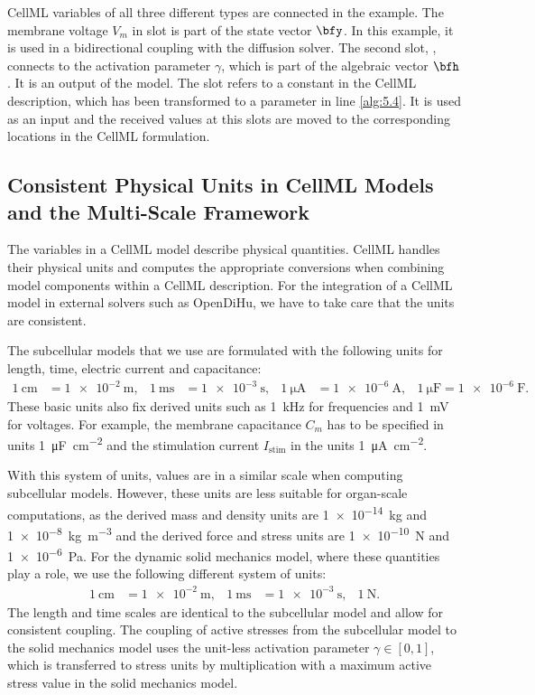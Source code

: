CellML variables of all three different types are connected in the example. The membrane voltage $V_m$ in slot  is part of the state vector $\bfy$. In this example, it is used in a bidirectional coupling with the diffusion solver. The second slot, , connects to the activation parameter $\gamma$, which is part of the algebraic vector $\bfh$. It is an output of the model. The slot  refers to a constant in the CellML description, which has been transformed to a parameter in line \ref{alg:5.4}. It is used as an  input and the received values at this slots are moved to the corresponding locations in the CellML formulation.


\subsection{Consistent Physical Units in CellML Models and the Multi-Scale Framework}

The variables in a CellML model describe physical quantities. CellML handles their physical units and computes the appropriate conversions when combining model components within a CellML description.
For the integration of a CellML model in external solvers such as OpenDiHu, we have to take care that the units are consistent.

The subcellular models that we use are formulated with the following units for length, time, electric current and capacitance:%
\begin{align*}
   \SI{1}{\centi\meter} &= \SI{1e-2}{\meter}, &
   \SI{1}{\milli\second} &= \SI{1e-3}{\second}, &
   \SI{1}{\micro\ampere} &= \SI{1e-6}{\ampere}, &
   \SI{1}{\micro\farad} = \SI{1e-6}{\farad}.
\end{align*}
These basic units also fix derived units such as \SI{1}{\kilo\hertz} for frequencies and \SI{1}{\milli\volt} for voltages. For example, the membrane capacitance $C_m$ has to be specified in units \SI{1}{\micro\farad\per\square\centi\meter} and the stimulation current $I_\text{stim}$ in the units \SI{1}{\micro\ampere\per\square\centi\meter}.

With this system of units, values are in a similar scale when computing subcellular models. However, these units are less suitable for organ-scale computations, as the derived mass and density units are \SI{1e-14}{\kilogram} and \SI{1e-8}{\kilogram\per\meter\cubed} and the derived force and stress units are \SI{1e-10}{\newton} and \SI{1e-6}{\pascal}. For the dynamic solid mechanics model, where these quantities play a role, we use the following different system of units:
\begin{align*}
   \SI{1}{\centi\meter} &= \SI{1e-2}{\meter}, &
   \SI{1}{\milli\second} &= \SI{1e-3}{\second}, &
   \SI{1}{\newton}.
\end{align*}
The length and time scales are identical to the subcellular model and allow for consistent coupling. The coupling of active stresses from the subcellular model to the solid mechanics model uses the unit-less activation parameter $\gamma \in [0,1]$, which is transferred to stress units by multiplication with a maximum active stress value in the solid mechanics model.

